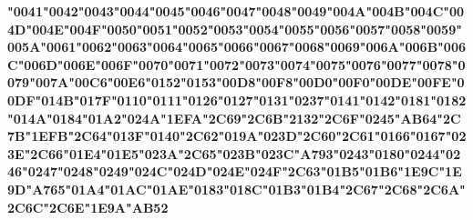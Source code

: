 {\LibertinusSerifPatch\bfseries 
	\char"0041\gs \char"0042\gs \char"0043\gs \char"0044\gs \char"0045\gs \char"0046\gs \char"0047\gs \char"0048\gs \char"0049\gs \char"004A\gs \char"004B\gs \char"004C\gs \char"004D\gs \char"004E\gs \char"004F\gs \char"0050\gs \char"0051\gs \char"0052\gs \char"0053\gs \char"0054\gs \char"0055\gs \char"0056\gs \char"0057\gs \char"0058\gs \char"0059\gs \char"005A\gs \char"0061\gs \char"0062\gs \char"0063\gs \char"0064\gs \char"0065\gs \char"0066\gs \char"0067\gs \char"0068\gs \char"0069\gs \char"006A\gs \char"006B\gs \char"006C\gs \char"006D\gs \char"006E\gs \char"006F\gs \char"0070\gs \char"0071\gs \char"0072\gs \char"0073\gs \char"0074\gs \char"0075\gs \char"0076\gs \char"0077\gs \char"0078\gs \char"0079\gs \char"007A\gs \char"00C6\gs \char"00E6\gs \char"0152\gs \char"0153\gs \char"00D8\gs \char"00F8\gs \char"00D0\gs \char"00F0\gs \char"00DE\gs \char"00FE\gs \char"00DF\gs \char"014B\gs \char"017F\gs \char"0110\gs \char"0111\gs \char"0126\gs \char"0127\gs \char"0131\gs \char"0237\gs \char"0141\gs \char"0142\gs \char"0181\gs \char"0182\gs \char"014A\gs \char"0184\gs \char"01A2\gs \char"024A\gs \char"1EFA\gs \char"2C69\gs \char"2C6B\gs \char"2132\gs \char"2C6F\gs \char"0245\gs \char"AB64\gs \char"2C7B\gs \char"1EFB\gs \char"2C64\gs \char"013F\gs \char"0140\gs \char"2C62\gs \char"019A\gs \char"023D\gs \char"2C60\gs \char"2C61\gs \char"0166\gs \char"0167\gs \char"023E\gs \char"2C66\gs \char"01E4\gs \char"01E5\gs \char"023A\gs \char"2C65\gs \char"023B\gs \char"023C\gs \char"A793\gs \char"0243\gs \char"0180\gs \char"0244\gs \char"0246\gs \char"0247\gs \char"0248\gs \char"0249\gs \char"024C\gs \char"024D\gs \char"024E\gs \char"024F\gs \char"2C63\gs \char"01B5\gs \char"01B6\gs \char"1E9C\gs \char"1E9D\gs \char"A765\gs \char"01A4\gs \char"01AC\gs \char"01AE\gs \char"0183\gs \char"018C\gs \char"01B3\gs \char"01B4\gs \char"2C67\gs \char"2C68\gs \char"2C6A\gs \char"2C6C\gs \char"2C6E\gs \char"1E9A\gs \char"AB52\gs
}

